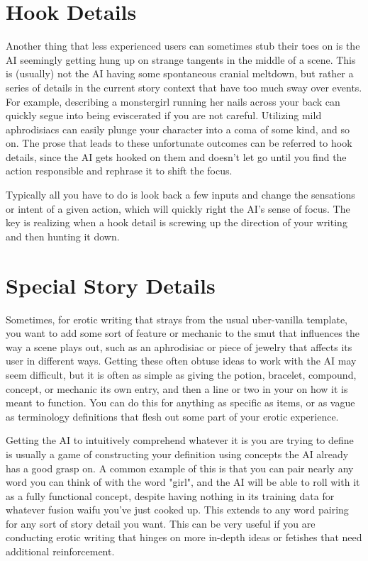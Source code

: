 ﻿\documentclass[Coomer-main.tex]{subfiles}
\begin{document}
\section{Hook Details}

Another thing that less experienced users can sometimes stub their toes on is the AI seemingly getting hung up on strange tangents in the middle of a scene.
This is (usually) not the AI having some spontaneous cranial meltdown, but rather a series of details in the current story context that have too much sway over events.
For example, describing a monstergirl running her nails across your back can quickly segue into being eviscerated if you are not careful.
Utilizing mild aphrodisiacs can easily plunge your character into a coma of some kind, and so on.
The prose that leads to these unfortunate outcomes can be referred to hook details, since the AI gets hooked on them and doesn't let go until you find the action responsible and rephrase it to shift the focus.

Typically all you have to do is look back a few inputs and change the sensations or intent of a given action, which will quickly right the AI's sense of focus.
The key is realizing when a hook detail is screwing up the direction of your writing and then hunting it down.

\section{Special Story Details}

Sometimes, for erotic writing that strays from the usual uber-vanilla template, you want to add some sort of feature or mechanic to the smut that influences the way a scene plays out, such as an aphrodisiac or piece of jewelry that affects its user in different ways.
Getting these often obtuse ideas to work with the AI may seem difficult, but it is often as simple as giving the potion, bracelet, compound, concept, or mechanic its own \wi entry, and then a line or two in your \rem on how it is meant to function.
You can do this for anything as specific as items, or as vague as terminology definitions that flesh out some part of your erotic experience.

Getting the AI to intuitively comprehend whatever it is you are trying to define is usually a game of constructing your definition using concepts the AI already has a good grasp on.
A common example of this is that you can pair nearly any word you can think of with the word "girl", and the AI will be able to roll with it as a fully functional concept, despite having nothing in its training data for whatever fusion waifu you've just cooked up. This extends to any word pairing for any sort of story detail you want.
This can be very useful if you are conducting erotic writing that hinges on more in-depth ideas or fetishes that need additional reinforcement.
\end{document}
